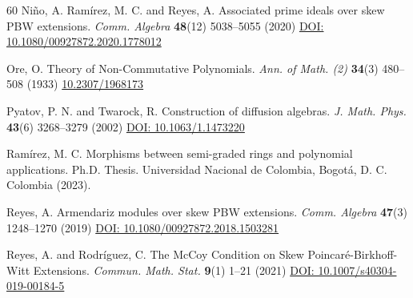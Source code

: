 \documentclass[reqno]{amsart}
\theoremstyle{definition}
\theoremstyle{remark}
\numberwithin{equation}{section}
\begin{document}
\begin{thebibliography}{60}
 Ni\~no, A. Ram\'irez, M. C. and Reyes, A. Associated prime ideals over skew PBW extensions. {\em Comm. Algebra} {\bf 48}(12) 5038--5055 (2020) \href{https://doi.org/10.1080/00927872.2020.1778012}{DOI: 10.1080/00927872.2020.1778012}


 Ore, O. Theory of Non-Commutative Polynomials. {\em Ann. of Math. (2)} {\bf 34}(3) 480--508 (1933) \href{https://doi.org/10.2307/1968173}{10.2307/1968173}

 Pyatov, P. N. and Twarock, R. Construction of diffusion algebras. {\em J. Math. Phys.} {\bf 43}(6) 3268--3279 (2002) \href{https://doi.org/10.1063/1.1473220}{DOI: 10.1063/1.1473220}

 Ram\'irez, M. C. Morphisms between semi-graded rings and polynomial applications. Ph.D. Thesis. Universidad Nacional de Colombia, Bogot\'a, D. C. Colombia (2023).



 Reyes, A. Armendariz modules over skew PBW extensions. {\em Comm. Algebra} {\bf 47}(3) 1248--1270 (2019) \href{https://doi.org/10.1080/00927872.2018.1503281}{DOI: 10.1080/00927872.2018.1503281}

 Reyes, A. and Rodr\'iguez, C. The McCoy Condition on Skew Poincar\'e-Birkhoff-Witt Extensions. {\em Commun. Math. Stat.} {\bf 9}(1) 1--21 (2021) \href{https://doi.org/10.1007/s40304-019-00184-5}{DOI: 10.1007/s40304-019-00184-5}



\end{thebibliography}
\end{document}
